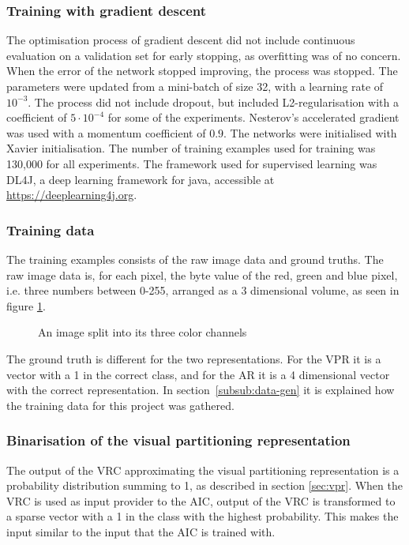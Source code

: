 \subsubsection{Training with gradient descent}
The optimisation process of gradient descent did not include continuous evaluation on a validation set for early stopping, as overfitting was of no concern. When the error of the network stopped improving, the process was stopped. The parameters were updated from a mini-batch of size 32, with a learning rate of $10^{-3}$. The process did not include dropout, but included L2-regularisation with a coefficient of $5 \cdot 10^{-4}$ for some of the experiments. Nesterov's accelerated gradient was used with a momentum coefficient of $0.9$. The networks were initialised with Xavier initialisation. The number of training examples used for training was 130,000 for all experiments. The framework used for supervised learning was DL4J, a deep learning framework for java, accessible at \url{https://deeplearning4j.org}.

\subsubsection{Training data}
The training examples consists of the raw image data and ground truths. The raw image data is, for each pixel, the byte value of the red, green and blue pixel, i.e. three numbers between 0-255, arranged as a 3 dimensional volume, as seen in figure \ref{fig:split}.

\begin{figure}[H]
    \centering
    
    \caption{An image split into its three color channels}
    \label{fig:split}
\end{figure}
\noindent
The ground truth is different for the two representations. For the VPR it is a vector with a 1 in the correct class, and for the AR it is a 4 dimensional vector with the correct representation.
In section~\ref{subsub:data-gen} it is explained how the training data for this project was gathered.


\subsubsection{Binarisation of the visual partitioning representation}
The output of the VRC approximating the visual partitioning representation is a probability distribution summing to 1, as described in section \ref{sec:vpr}. When the VRC is used as input provider to the AIC, output of the VRC is transformed to a sparse vector with a 1 in the class with the highest probability. This makes the input similar to the input that the AIC is trained with.

